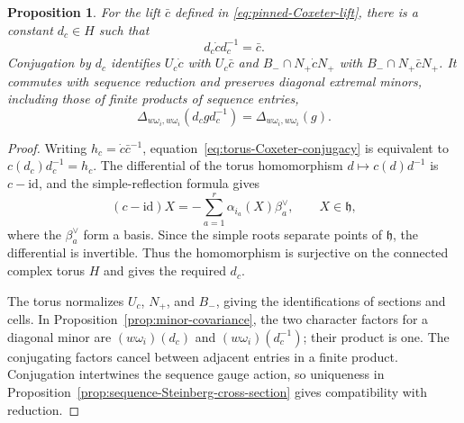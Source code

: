 \documentclass[11pt,leqno]{amsart}
\numberwithin{equation}{section}
\theoremstyle{plain}
\newtheorem{proposition}[theorem]{Proposition}
\theoremstyle{definition}
\theoremstyle{plain}
\theoremstyle{definition}
\theoremstyle{remark}
\begin{document}
\begin{proposition}\label{prop:Coxeter-lift-comparison}
For the lift $\bar c$ defined in \eqref{eq:pinned-Coxeter-lift}, there is a constant $d_c\in H$ such that
\begin{equation}\label{eq:torus-Coxeter-conjugacy}
 d_c\dot c d_c^{-1}=\bar c.
\end{equation}
Conjugation by $d_c$ identifies $U_c\dot c$ with $U_c\bar c$ and $B_-\cap N_+\dot cN_+$ with $B_-\cap N_+\bar cN_+$.  It commutes with sequence reduction and preserves diagonal extremal minors, including those of finite products of sequence entries,
\begin{equation}\label{eq:diagonal-minors-lift-invariance}
 \Delta_{w\omega_i,w\omega_i}(d_cgd_c^{-1})
   =\Delta_{w\omega_i,w\omega_i}(g).
\end{equation}
\end{proposition}
\begin{proof}
Writing $h_c=\dot c\bar c^{-1}$, equation~\eqref{eq:torus-Coxeter-conjugacy} is equivalent to $c(d_c)d_c^{-1}=h_c$.  The differential of the torus homomorphism $d\mapsto c(d)d^{-1}$ is $c-\mathrm{id}$, and the simple-reflection formula gives
\[
 (c-\mathrm{id})X
 =-\sum_{a=1}^r\alpha_{i_a}(X)\beta_a^\vee,
 \qquad X\in\mathfrak h,
\]
where the $\beta_a^\vee$ form a basis.  Since the simple roots separate points of $\mathfrak h$, the differential is invertible.  Thus the homomorphism is surjective on the connected complex torus $H$ and gives the required $d_c$.

The torus normalizes $U_c$, $N_+$, and $B_-$, giving the identifications of sections and cells.  In Proposition~\ref{prop:minor-covariance}, the two character factors for a diagonal minor are $(w\omega_i)(d_c)$ and $(w\omega_i)(d_c^{-1})$; their product is one.  The conjugating factors cancel between adjacent entries in a finite product.  Conjugation intertwines the sequence gauge action, so uniqueness in Proposition~\ref{prop:sequence-Steinberg-cross-section} gives compatibility with reduction.
\end{proof}
\end{document}
